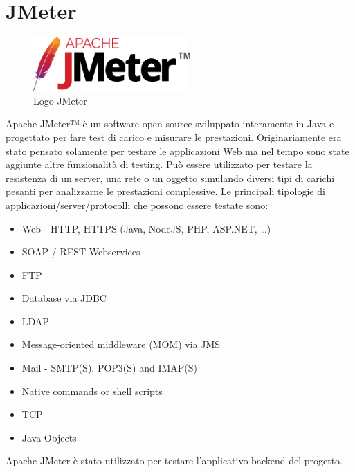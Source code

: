 \section{JMeter}
\begin{figure}[ht!]
\begin{center}
  \includegraphics[width=6cm]{images/jmeter_logo.png}
  \caption{Logo JMeter}
\end{center}
\end{figure}
\FloatBarrier
Apache JMeter™ è un software open source sviluppato interamente in Java e progettato per fare test di carico e misurare le prestazioni. Originariamente era stato pensato solamente per testare le applicazioni Web ma nel tempo sono state aggiunte altre funzionalità di testing. 
Può essere utilizzato per testare la resistenza di un server, una rete o un oggetto simulando diversi tipi di carichi pesanti per analizzarne le prestazioni complessive.
Le principali tipologie di applicazioni/server/protocolli che possono essere testate sono:
\begin{itemize}
    \item Web - HTTP, HTTPS (Java, NodeJS, PHP, ASP.NET, …)
    \item SOAP / REST Webservices
    \item FTP
    \item Database via JDBC
    \item LDAP
    \item Message-oriented middleware (MOM) via JMS
    \item Mail - SMTP(S), POP3(S) and IMAP(S)
    \item Native commands or shell scripts
    \item TCP
    \item Java Objects
\end{itemize}
\cite{JMETER} 
Apache JMeter è stato utilizzato per testare l'applicativo backend del progetto.